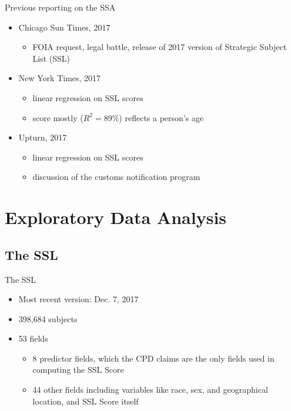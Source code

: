 \documentclass{beamer}
\begin{document}
\begin{frame}{Previous reporting on the SSA}
  \begin{itemize}
  \item {
    Chicago Sun Times, 2017
    \begin{itemize}
        \item FOIA request, legal battle, release of 2017 version of Strategic Subject List (SSL)
    \end{itemize}
  }
  \item {
    New York Times, 2017
    \begin{itemize}
        \item linear regression on SSL scores
        \item score mostly ($R^2 = 89$\%) reflects a person's age
    \end{itemize}
  }
  \item {   
    Upturn, 2017
    \begin{itemize}
        \item linear regression on SSL scores
        \item discussion of the customs notification program
    \end{itemize}
  }
  \end{itemize}
\end{frame}

\section{Exploratory Data Analysis}

\subsection{The SSL}

\begin{frame}{The SSL}
\begin{itemize}
    \item Most recent version: Dec. 7, 2017
    \item 398,684 subjects
    \item 53  fields
    \begin{itemize}
        \item 8  predictor  fields,  which  the  CPD  claims  are  the  only  fields used  in  computing  the  SSL  Score
        \item  44  other  fields  including  variables  like  race,  sex,  and geographical location,  and SSL Score itself
    \end{itemize} 
    
\end{itemize}
\end{frame}
\end{document}

